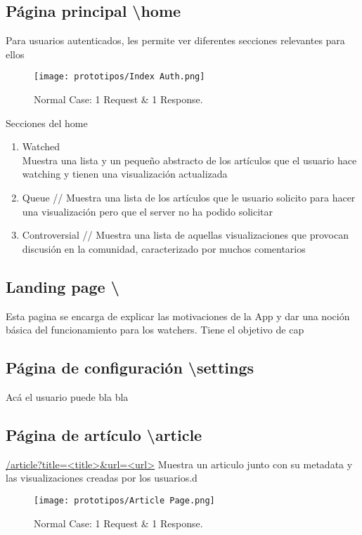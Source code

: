 \subsection{Página principal \textbackslash home}
Para usuarios autenticados, les permite ver diferentes secciones relevantes para ellos

\begin{figure}[ht]
    \centering
         \texttt{[image: prototipos/Index Auth.png]}
          \caption{Normal Case: 1 Request \& 1 Response.}
           \label{normal_case}
\end{figure}


Secciones del home
\begin{enumerate}
    \item Watched \\ Muestra una lista y un pequeño abstracto de los artículos que el usuario hace watching y tienen una visualización actualizada
    \item Queue // Muestra una lista de los artículos que le usuario solicito para hacer una visualización pero que el server no ha podido solicitar
    \item Controversial // Muestra una lista de aquellas visualizaciones que provocan discusión en la comunidad, caracterizado por muchos comentarios
\end{enumerate}


\subsection{Landing page \textbackslash}
Esta pagina se encarga de explicar las motivaciones de la App y dar una noción básica del funcionamiento para los watchers.
Tiene el objetivo de cap


\subsection{Página de configuración \textbackslash settings}
Acá el usuario puede bla bla 


\subsection{Página de artículo \textbackslash article} 
\url{/article?title=<title>&url=<url>}
Muestra un articulo junto con su metadata y las visualizaciones creadas por los usuarios.d

\begin{figure}[ht]
    \centering
         \texttt{[image: prototipos/Article Page.png]}
          \caption{Normal Case: 1 Request \& 1 Response.}
           \label{normal_case}
\end{figure}

